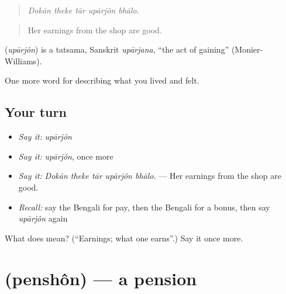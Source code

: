 \begin{quote}
    
\end{quote}

\begin{quote}
\emph{Dokān theke tār upārjôn bhālo.}
\end{quote}

\begin{quote}
Her earnings from the shop are good.
\end{quote}

\begin{cousinweb}
\textbf{} (\emph{upārjôn}) is a tatsama, Sanskrit \emph{upārjana}, \textquotedblleft{}the act of gaining\textquotedblright{} (Monier-Williams).
\end{cousinweb}

\begin{grammarlens}[title={What you've built}]
One more word for describing what you lived and felt.
\end{grammarlens}

\subsection*{Your turn}
\begin{itemize}
\raggedright
  \item \emph{Say it:} \emph{upārjôn}
  \item \emph{Say it:} \emph{upārjôn}, once more
  \item \emph{Say it:} \emph{Dokān theke tār upārjôn bhālo.} — Her earnings from the shop are good.
  \item \emph{Recall:} say the Bengali for pay, then the Bengali for a bonus, then say \emph{upārjôn} again
\end{itemize}

\begin{tcolorbox}[breakable,colback=teal!4,colframe=teal!35!black,title={Before you move on}]
What does  mean? (\textquotedblleft{}Earnings; what one earns\textquotedblright{}.) Say it once more.
\end{tcolorbox}
\section[\texorpdfstring{\bn{পেনশন} (penshôn)}{পেনশন (penshôn)}]{ (penshôn) — a pension}

\label{lesson:BN-C495-penshon}



